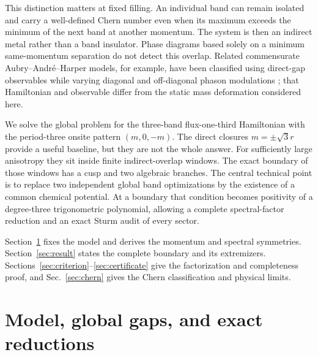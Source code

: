 \documentclass[aps,prb,preprint,superscriptaddress,nofootinbib]{revtex4-2}
\begin{document}
This distinction matters at fixed filling.  An individual band can remain
isolated and carry a well-defined Chern number even when its maximum exceeds
the minimum of the next band at another momentum.  The system is then an
indirect metal rather than a band insulator.  Phase diagrams based solely on a
minimum same-momentum separation do not detect this overlap.  Related
commensurate Aubry--Andr\'e--Harper models, for example, have been classified
using direct-gap observables while varying diagonal and off-diagonal phason
modulations \cite{Ke2016}; that Hamiltonian and observable differ from the
static mass deformation considered here.

We solve the global problem for the three-band flux-one-third Hamiltonian with
the period-three onsite pattern $(m,0,-m)$.  The direct closures
$m=\pm\sqrt3r$ provide a useful baseline, but they are not the whole answer.
For sufficiently large anisotropy they sit inside finite indirect-overlap
windows.  The exact boundary of those windows has a cusp and two algebraic
branches.  The central technical point is to replace two independent global
band optimizations by the existence of a common chemical potential.  At a
boundary that condition becomes positivity of a degree-three trigonometric
polynomial, allowing a complete spectral-factor reduction and an exact Sturm
audit of every sector.

Section~\ref{sec:model} fixes the model and derives the momentum and spectral
symmetries.  Section~\ref{sec:result} states the complete boundary and its
extremizers.  Sections~\ref{sec:criterion}--\ref{sec:certificate} give the
factorization and completeness proof, and Sec.~\ref{sec:chern} gives the Chern
classification and physical limits.

\section{Model, global gaps, and exact reductions}
\label{sec:model}
\end{document}
